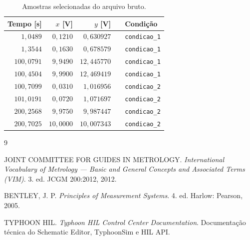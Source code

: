 \documentclass[12pt,a4paper]{article}
\newcommand{\condum}{\texttt{condicao\_1}}
\newcommand{\conddois}{\texttt{condicao\_2}}
\begin{document}
\begin{table}[H]
  \centering
  \caption{Amostras selecionadas do arquivo bruto.}
  \label{tab:amostras}
  \small
  \begin{tabular}{rrrrl}
    \toprule
    Tempo [s] & $x$ [V] & $y$ [V] & & Condição \\
    \midrule
    $1{,}0489$ & $0{,}1210$ & $0{,}630927$ && \condum \\
    $1{,}3544$ & $0{,}1630$ & $0{,}678579$ && \condum \\
    $100{,}0791$ & $9{,}9490$ & $12{,}445770$ && \condum \\
    $100{,}4504$ & $9{,}9900$ & $12{,}469419$ && \condum \\
    $100{,}7099$ & $0{,}0310$ & $1{,}016956$ && \conddois \\
    $101{,}0191$ & $0{,}0720$ & $1{,}071697$ && \conddois \\
    $200{,}2568$ & $9{,}9750$ & $9{,}987447$ && \conddois \\
    $200{,}7025$ & $10{,}0000$ & $10{,}007343$ && \conddois \\
    \bottomrule
  \end{tabular}
\end{table}

\clearpage
\begin{thebibliography}{9}

JOINT COMMITTEE FOR GUIDES IN METROLOGY.
\textit{International Vocabulary of Metrology --- Basic and General Concepts and Associated Terms (VIM)}.
3. ed. JCGM 200:2012, 2012.

BENTLEY, J. P.
\textit{Principles of Measurement Systems}.
4. ed. Harlow: Pearson, 2005.

TYPHOON HIL.
\textit{Typhoon HIL Control Center Documentation}.
Documentação técnica do Schematic Editor, TyphoonSim e HIL API.

\end{thebibliography}
\end{document}
